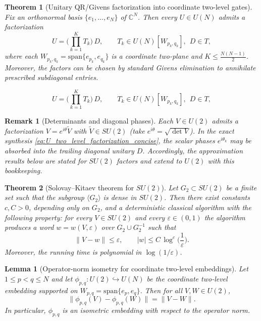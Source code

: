 \documentclass[10pt,a4paper]{amsart}
\newtheorem{lemma}{Lemma}
\newtheorem{theorem}{Theorem}
\newtheorem{remark}{Remark}
\newcommand{\C}{\mathbb{C}}
\begin{document}
\begin{theorem}[Unitary QR/Givens factorization into coordinate two-level gates]
\label{thm:two_level_factorization_concise}
Fix an orthonormal basis $\{e_1,\dots,e_N\}$ of $\C^N$. Then every $U\in U(N)$ admits a factorization
\begin{equation}\label{eq:U_two_level_factorization_concise}
U=\Big(\prod_{k=1}^{K} T_k\Big)\,D,
\qquad
T_k\in U(N)[W_{p_k,q_k}],\ \ D\in T,
\end{equation}
where each $W_{p_k,q_k}=\mathrm{span}\{e_{p_k},e_{q_k}\}$ is a coordinate two-plane and $K\le \frac{N(N-1)}{2}$.
Moreover, the factors can be chosen by standard Givens elimination to annihilate prescribed subdiagonal entries.
\end{theorem}

\begin{equation}
U=\Big(\prod_{k=1}^{K} T_k\Big)\,D,
\qquad
T_k\in U(N)[W_{p_k,q_k}],\ \ D\in T,
\end{equation}

\begin{remark}[Determinants and diagonal phases]\label{rem:det_bookkeeping}
Each $V\in U(2)$ admits a factorization $V=e^{i\theta}\widetilde V$ with $\widetilde V\in SU(2)$ (take $e^{i\theta}=\sqrt{\det V}$).
In the exact synthesis \eqref{eq:U_two_level_factorization_concise}, the scalar phases $e^{i\theta_k}$ may be absorbed into the trailing diagonal
unitary $D$. Accordingly, the approximation results below are stated for $SU(2)$ factors and extend to $U(2)$ with this bookkeeping.
\end{remark}

\begin{theorem}[Solovay--Kitaev theorem for $SU(2)$]\label{thm:SK}
Let $G_2\subset SU(2)$ be a finite set such that the subgroup $\langle G_2\rangle$ is dense in $SU(2)$.
Then there exist constants $c,C>0$, depending only on $G_2$, and a deterministic classical algorithm with the following property:
for every $V\in SU(2)$ and every $\varepsilon\in(0,1)$ the algorithm produces a word $w=w(V,\varepsilon)$ over
$G_2\cup G_2^{-1}$ such that
\[
\|V-w\|\le \varepsilon,
\qquad
|w|\le C\,\log^{c}\!\Big(\frac{1}{\varepsilon}\Big).
\]
Moreover, the running time is polynomial in $\log(1/\varepsilon)$.
\end{theorem}

\begin{lemma}[Operator-norm isometry for coordinate two-level embeddings]
\label{lem:two_level_isometry}
Let $1\le p<q\le N$ and let $\phi_{p,q}:U(2)\hookrightarrow U(N)$ be the coordinate two-level embedding supported on
$W_{p,q}=\mathrm{span}\{e_p,e_q\}$. Then for all $V,W\in U(2)$,
\[
\big\|\phi_{p,q}(V)-\phi_{p,q}(W)\big\|=\|V-W\|.
\]
In particular, $\phi_{p,q}$ is an isometric embedding with respect to the operator norm.
\end{lemma}
\end{document}
